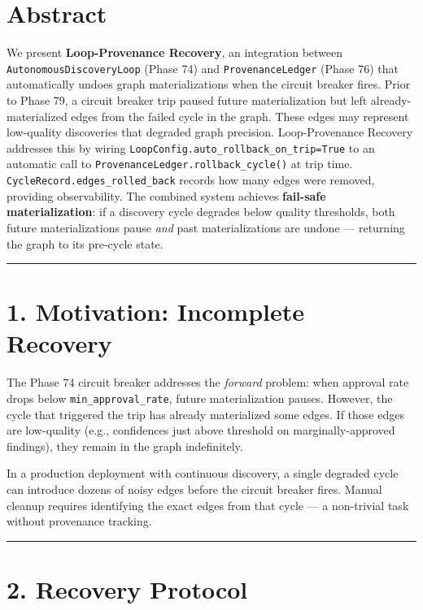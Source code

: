 
\section*{Abstract}

We present \textbf{Loop-Provenance Recovery}, an integration between \texttt{AutonomousDiscoveryLoop} (Phase 74) and \texttt{ProvenanceLedger} (Phase 76) that automatically undoes graph materializations when the circuit breaker fires. Prior to Phase 79, a circuit breaker trip paused future materialization but left already-materialized edges from the failed cycle in the graph. These edges may represent low-quality discoveries that degraded graph precision. Loop-Provenance Recovery addresses this by wiring \texttt{LoopConfig.auto\_rollback\_on\_trip=True} to an automatic call to \texttt{ProvenanceLedger.rollback\_cycle()} at trip time. \texttt{CycleRecord.edges\_rolled\_back} records how many edges were removed, providing observability. The combined system achieves \textbf{fail-safe materialization}: if a discovery cycle degrades below quality thresholds, both future materializations pause \textit{and} past materializations are undone --- returning the graph to its pre-cycle state.

\medskip\noindent\rule{\linewidth}{0.4pt}\medskip

\section*{1. Motivation: Incomplete Recovery}

The Phase 74 circuit breaker addresses the \textit{forward} problem: when approval rate drops below \texttt{min\_approval\_rate}, future materialization pauses. However, the cycle that triggered the trip has already materialized some edges. If those edges are low-quality (e.g., confidences just above threshold on marginally-approved findings), they remain in the graph indefinitely.

In a production deployment with continuous discovery, a single degraded cycle can introduce dozens of noisy edges before the circuit breaker fires. Manual cleanup requires identifying the exact edges from that cycle --- a non-trivial task without provenance tracking.

\medskip\noindent\rule{\linewidth}{0.4pt}\medskip

\section*{2. Recovery Protocol}

